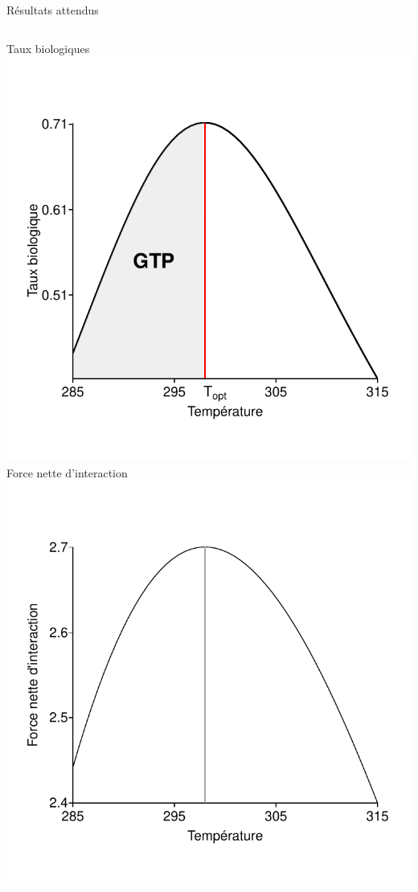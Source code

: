 \documentclass[11pt, compress, aspectratio=1610]{beamer}
\newcommand{\begincols}{\begin{columns}}
\newcommand{\stopcols}{\end{columns}}
\begin{document}
\begin{frame}{Résultats attendus}

\begincols
  \centering
Taux biologiques
\includegraphics[width=1.1\linewidth]{figuresAz/MTE.pdf} \pause
{} \centering
Force nette d'interaction
\includegraphics[width=1.1\linewidth]{figuresAz/NetIS.pdf} \stopcols

\end{frame}
\end{document}
